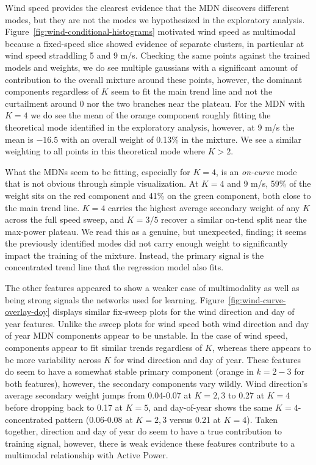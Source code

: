 \documentclass[10pt]{article}
\begin{document}
Wind speed provides the clearest evidence that the MDN discovers different modes, but they are not the modes we hypothesized in the exploratory analysis.
Figure~\ref{fig:wind-conditional-histograms} motivated wind speed as multimodal because a fixed-speed slice showed evidence of separate clusters, in particular at wind speed straddling 5 and 9 m/s.
Checking the same points against the trained models and weights, we do see multiple gaussians with a significant amount of contribution to the overall mixture around these points, however, the dominant components regardless of $K$ seem to fit the main trend line and not the curtailment around 0 nor the two branches near the plateau.
For the MDN with $K=4$ we do see the mean of the orange component roughly fitting the theoretical mode identified in the exploratory analysis, however, at 9 m/s the mean is $-16.5$ with an overall weight of 0.13\% in the mixture.
We see a similar weighting to all points in this theoretical mode where $K>2$.

What the MDNs seem to be fitting, especially for $K=4$, is an \emph{on-curve} mode that is not obvious through simple visualization.
At $K=4$ and 9 m/s, 59\% of the weight sits on the red component and 41\% on the green component, both close to the main trend line.
$K=4$ carries the highest average secondary weight of any $K$ across the full speed sweep, and $K=3/5$ recover a similar on-tend split near the max-power plateau.
We read this as a genuine, but unexpected, finding; it seems the previously identified modes did not carry enough weight to significantly impact the training of the mixture.
Instead, the primary signal is the concentrated trend line that the regression model also fits.

The other features appeared to show a weaker case of multimodality as well as being strong signals the networks used for learning.
Figure~\ref{fig:wind-curve-overlay-doy} displays similar fix-sweep plots for the wind direction and day of year features.
Unlike the sweep plots for wind speed both wind direction and day of year MDN components appear to be unstable.
In the case of wind speed, components appear to fit similar trends regardless of $K$, whereas there appears to be more variability across $K$ for wind direction and day of year.
These features do seem to have a somewhat stable primary component (orange in $k=2-3$ for both features), however, the secondary components vary wildly.
Wind direction's average secondary weight jumps from 0.04-0.07 at $K=2,3$ to 0.27 at $K=4$ before dropping back to 0.17 at $K=5$, and day-of-year shows the same $K=4$-concentrated pattern (0.06-0.08 at $K=2,3$ versus 0.21 at $K=4$).
Taken together, direction and day of year do seem to have a true contribution to training signal, however, there is weak evidence these features contribute to a multimodal relationship with Active Power.
\end{document}
